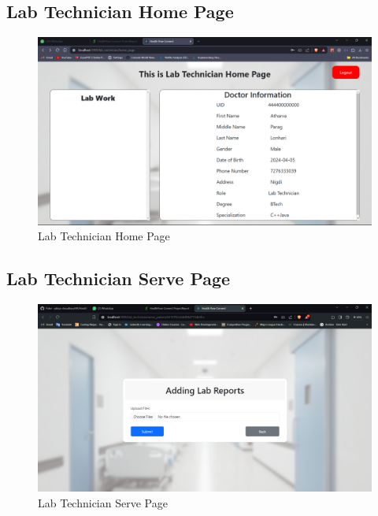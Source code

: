 \subsection{Lab Technician Home Page}
\begin{figure}[h!]
    \centering
    \includegraphics[width=\textwidth]{Lab_Technician_Home_Page.png}
    \caption{Lab Technician Home Page}
\end{figure}
\subsection{Lab Technician Serve Page}
\begin{figure}[h!]
    \centering
    \includegraphics[width=\textwidth]{Lab_Technician_Serve_Page.png}
    \caption{Lab Technician Serve Page}
\end{figure}

\clearpage
